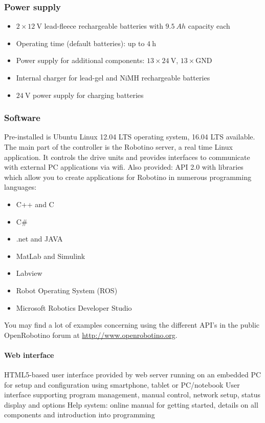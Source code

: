 \documentclass[12pt,twoside]{article}
\begin{document}
\begin{appendix}
\subsubsection{Power supply}
\begin{itemize}
  \item $2 \times \SI{12}{\volt}$ lead-fleece rechargeable batteries with
    $\SI{9.5}{Ah}$ capacity each
  \item Operating time (default batteries): up to $\SI{4}{\hour}$
\item Power supply for additional components: $13 \times \SI{24}{\volt}$,
  $13 \times \text{GND}$
\item Internal charger for lead-gel and NiMH rechargeable batteries
\item $\SI{24}{\volt}$ power supply for charging batteries
\end{itemize}

\subsubsection{Software}
Pre-installed is Ubuntu Linux 12.04 LTS operating system, 16.04 LTS available.
The main part of the controller is the Robotino server, a real time Linux
application. It controls the drive units and provides interfaces to
communicate with external PC applications via wifi. Also provided: API
2.0 with libraries which allow you to create applications for Robotino
in numerous programming languages:

\begin{itemize}
\item C++ and C
\item C\#
\item {.net} and JAVA
\item MatLab and Simulink
\item Labview
\item Robot Operating System (ROS)
\item Microsoft Robotics Developer Studio
\end{itemize}

You may find a lot of examples concerning using the different API's in
the public OpenRobotino forum at \mbox{\url{http://www.openrobotino.org}}.

\paragraph{Web interface}
HTML5-based user interface provided by web server running on an embedded
PC for setup and configuration using smartphone, tablet or PC/notebook
User interface supporting program management, manual control, network
setup, status display and options Help system: online manual for
getting started, details on all components and introduction into
programming


\end{appendix}
\end{document}
